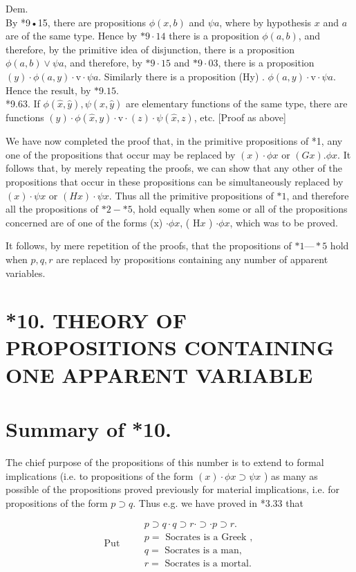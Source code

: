 \documentclass[10pt]{article}
\begin{document}
Dem.\\
By *9•15, there are propositions $\phi(x, b)$ and $\psi a$, where by hypothesis $x$ and $a$ are of the same type. Hence by $* 9 \cdot 14$ there is a proposition $\phi(a, b)$, and therefore, by the primitive idea of disjunction, there is a proposition $\phi(a, b) \vee \psi a$, and therefore, by $* 9 \cdot 15$ and $* 9 \cdot 03$, there is a proposition $(y) \cdot \phi(a, y) \cdot \mathrm{v} \cdot \psi a$. Similarly there is a proposition (Hy) . $\phi(a, y) \cdot \mathrm{v} \cdot \psi a$. Hence the result, by $* 9.15$.\\
*9.63. If $\phi(\hat{x}, \hat{y}), \psi(\hat{x}, \hat{y})$ are elementary functions of the same type, there are functions $(y) \cdot \phi(\hat{x}, y) \cdot \mathrm{v} \cdot(z) \cdot \psi(\hat{x}, z)$, etc. [Proof as above]

We have now completed the proof that, in the primitive propositions of *1, any one of the propositions that occur may be replaced by $(x) \cdot \phi x$ or $(G x) . \phi x$. It follows that, by merely repeating the proofs, we can show that any other of the propositions that occur in these propositions can be simultaneously replaced by $(x) \cdot \psi x$ or $(H x) \cdot \psi x$. Thus all the primitive propositions of $* 1$, and therefore all the propositions of $* 2-* 5$, hold equally when some or all of the propositions concerned are of one of the forms (x) $\cdot \phi x$, ( $\mathrm{H} x$ ) $\cdot \phi x$, which was to be proved.

It follows, by mere repetition of the proofs, that the propositions of $* 1 — * 5$ hold when $p, q, r$ are replaced by propositions containing any number of apparent variables.

\section*{*10. THEORY OF PROPOSITIONS CONTAINING ONE APPARENT VARIABLE}
\section*{Summary of *10.}
The chief purpose of the propositions of this number is to extend to formal implications (i.e. to propositions of the form $(x) \cdot \phi x \supset \psi x$ ) as many as possible of the propositions proved previously for material implications, i.e. for propositions of the form $p \supset q$. Thus e.g. we have proved in *3.33 that

$$
\text { Put } \quad \begin{aligned}
& p \supset q \cdot q \supset r \cdot \supset \cdot p \supset r . \\
& p=\text { Socrates is a Greek }, \\
& q=\text { Socrates is a man, } \\
& r=\text { Socrates is a mortal. }
\end{aligned}
$$
\end{document}
